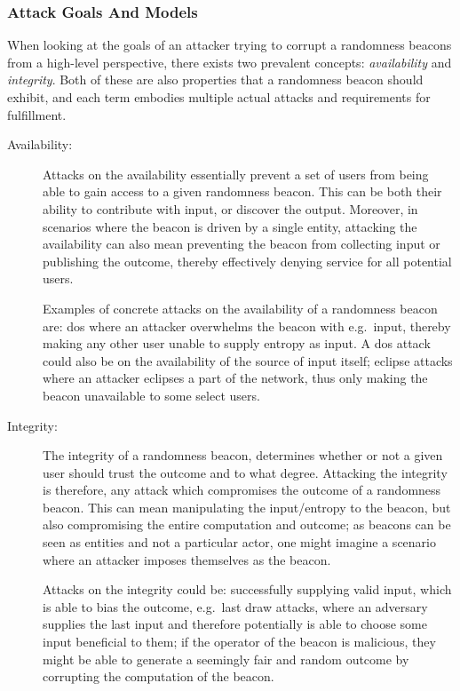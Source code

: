 \subsubsection{Attack Goals And Models}
\label{ssub:attack_goals_and_models}
When looking at the goals of an attacker trying to corrupt a randomness beacons from a high-level perspective, there exists two prevalent concepts: \emph{availability} and \emph{integrity}.
Both of these are also properties that a randomness beacon should exhibit, and each term embodies multiple actual attacks and requirements for fulfillment.

\begin{description}
    \item[Availability:]
        Attacks on the availability essentially prevent a set of users from being able to gain access to a given randomness beacon.
        This can be both their ability to contribute with input, or discover the output.
        Moreover, in scenarios where the beacon is driven by a single entity, attacking the availability can also mean preventing the beacon from collecting input or publishing the outcome, thereby effectively denying service for all potential users.

        Examples of concrete attacks on the availability of a randomness beacon are:
        \acrfull{dos} where an attacker overwhelms the beacon with e.g.\ input, thereby making any other user unable to supply entropy as input. A \gls{dos} attack could also be on the availability of the source of input itself; eclipse attacks where an attacker eclipses a part of the network, thus only making the beacon unavailable to some select users.
    \item[Integrity:]
        The integrity of a randomness beacon, determines whether or not a given user should trust the outcome and to what degree.
        Attacking the integrity is therefore, any attack which compromises the outcome of a randomness beacon.
        This can mean manipulating the input/entropy to the beacon, but also compromising the entire computation and outcome;
        as beacons can be seen as entities and not a particular actor, one might imagine a scenario where an attacker imposes themselves as the beacon.

        Attacks on the integrity could be: successfully supplying valid input, which is able to bias the outcome, e.g.\ last draw attacks, where an adversary supplies the last input and therefore potentially is able to choose some input beneficial to them; if the operator of the beacon is malicious, they might be able to generate a seemingly fair and random outcome by corrupting the computation of the beacon.
\end{description}


